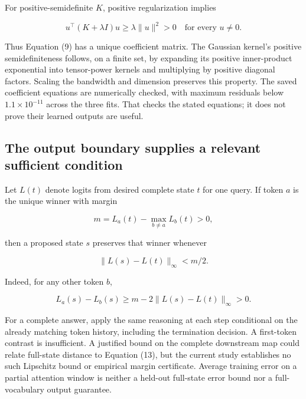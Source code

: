 \documentclass[11pt,letterpaper]{article}
\begin{document}
For positive-semidefinite \(K\), positive regularization implies

\begin{equation}
u^\top(K+\lambda I)u\ge\lambda\lVert u\rVert^2>0
\quad\text{for every }u\ne0. \tag{11}
\end{equation}

Thus Equation (9) has a unique coefficient matrix. The Gaussian kernel's positive semidefiniteness follows, on a finite set, by expanding its positive inner-product exponential into tensor-power kernels and multiplying by positive diagonal factors. Scaling the bandwidth and dimension preserves this property. The saved coefficient equations are numerically checked, with maximum residuals below \(1.1\times10^{-11}\) across the three fits. That checks the stated equations; it does not prove their learned outputs are useful.

\subsection{The output boundary supplies a relevant sufficient condition}

Let \(L(t)\) denote logits from desired complete state \(t\) for one query. If token \(a\) is the unique winner with margin

\begin{equation}
m=L_a(t)-\max_{b\ne a}L_b(t)>0, \tag{12}
\end{equation}

then a proposed state \(s\) preserves that winner whenever

\begin{equation}
\lVert L(s)-L(t)\rVert_\infty<m/2. \tag{13}
\end{equation}

Indeed, for any other token \(b\),

\begin{equation}
L_a(s)-L_b(s)\ge m-2\lVert L(s)-L(t)\rVert_\infty>0. \tag{14}
\end{equation}

For a complete answer, apply the same reasoning at each step conditional on the already matching token history, including the termination decision. A first-token contrast is insufficient. A justified bound on the complete downstream map could relate full-state distance to Equation (13), but the current study establishes no such Lipschitz bound or empirical margin certificate. Average training error on a partial attention window is neither a held-out full-state error bound nor a full-vocabulary output guarantee.
\end{document}

